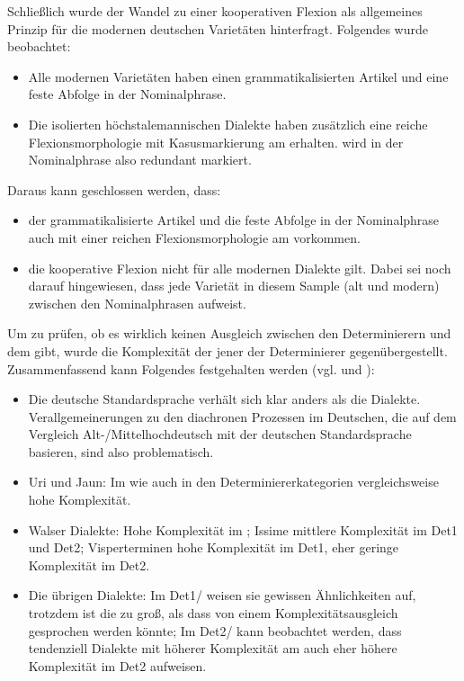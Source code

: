 Schließlich wurde der Wandel zu einer kooperativen Flexion als allgemeines Prinzip für die modernen deutschen Varietäten hinterfragt. Folgendes wurde beobachtet:\largerpage[2]

\begin{itemize}
\item
Alle modernen Varietäten haben einen grammatikalisierten Artikel und eine feste Abfolge in der Nominalphrase.
\item
Die isolierten höchstalemannischen Dialekte haben zusätzlich eine reiche Flexionsmorphologie mit Kasusmarkierung am  erhalten.  wird in der Nominalphrase also redundant markiert.
\end{itemize}

\noindent
Daraus kann geschlossen werden, dass:

\begin{itemize}
\item
der grammatikalisierte Artikel und die feste Abfolge in der Nominalphrase auch mit einer reichen Flexionsmorphologie am  vorkommen.
\item
die kooperative Flexion nicht für alle modernen Dialekte gilt. Dabei sei noch darauf hingewiesen, dass jede Varietät in diesem Sample (alt und modern)  zwischen den Nominalphrasen aufweist.
\end{itemize}

Um zu prüfen, ob es wirklich keinen Ausgleich zwischen den Determinierern und dem  gibt, wurde die Komplexität der  jener der Determinierer gegenübergestellt. Zusammenfassend kann Folgendes festgehalten werden (vgl.  und ):

\begin{itemize}
\item
Die deutsche Standardsprache verhält sich klar anders als die Dialekte. Verallgemeinerungen zu den diachronen Prozessen im Deutschen, die auf dem Vergleich Alt-/Mittelhochdeutsch mit der deutschen Standardsprache basieren, sind also problematisch.
\item
Uri und Jaun: Im  wie auch in den Determiniererkategorien vergleichsweise hohe Komplexität.
\item
Walser Dialekte: Hohe Komplexität im ; Issime mittlere Komplexität im Det1 und Det2; Visperterminen hohe Komplexität im Det1, eher geringe Komplexität im Det2.
\item
Die übrigen Dialekte: Im Det1/ weisen sie gewissen Ähnlichkeiten auf, trotzdem ist die  zu groß, als dass von einem Komplexitätsausgleich gesprochen werden könnte; Im Det2/ kann beobachtet werden, dass tendenziell Dialekte mit höherer Komplexität am  auch eher höhere Komplexität im Det2 aufweisen.
\end{itemize}

